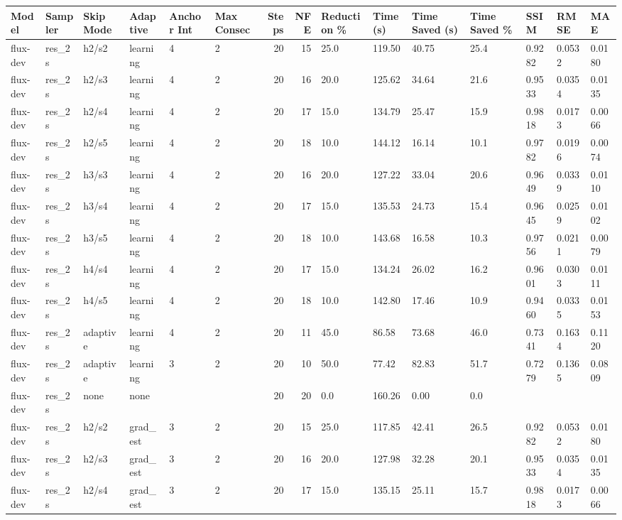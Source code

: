 \begin{tabular}{llllllrrlllllll}
\toprule
Model & Sampler & Skip Mode & Adaptive & Anchor Int & Max Consec & Steps & NFE & Reduction \% & Time (s) & Time Saved (s) & Time Saved \% & SSIM & RMSE & MAE \\
\midrule
flux-dev & res_2s & h2/s2 & learning & 4 & 2 & 20 & 15 & 25.0 & 119.50 & 40.75 & 25.4 & 0.9282 & 0.0532 & 0.0180 \\
flux-dev & res_2s & h2/s3 & learning & 4 & 2 & 20 & 16 & 20.0 & 125.62 & 34.64 & 21.6 & 0.9533 & 0.0354 & 0.0135 \\
flux-dev & res_2s & h2/s4 & learning & 4 & 2 & 20 & 17 & 15.0 & 134.79 & 25.47 & 15.9 & 0.9818 & 0.0173 & 0.0066 \\
flux-dev & res_2s & h2/s5 & learning & 4 & 2 & 20 & 18 & 10.0 & 144.12 & 16.14 & 10.1 & 0.9782 & 0.0196 & 0.0074 \\
flux-dev & res_2s & h3/s3 & learning & 4 & 2 & 20 & 16 & 20.0 & 127.22 & 33.04 & 20.6 & 0.9649 & 0.0339 & 0.0110 \\
flux-dev & res_2s & h3/s4 & learning & 4 & 2 & 20 & 17 & 15.0 & 135.53 & 24.73 & 15.4 & 0.9645 & 0.0259 & 0.0102 \\
flux-dev & res_2s & h3/s5 & learning & 4 & 2 & 20 & 18 & 10.0 & 143.68 & 16.58 & 10.3 & 0.9756 & 0.0211 & 0.0079 \\
flux-dev & res_2s & h4/s4 & learning & 4 & 2 & 20 & 17 & 15.0 & 134.24 & 26.02 & 16.2 & 0.9601 & 0.0303 & 0.0111 \\
flux-dev & res_2s & h4/s5 & learning & 4 & 2 & 20 & 18 & 10.0 & 142.80 & 17.46 & 10.9 & 0.9460 & 0.0335 & 0.0153 \\
flux-dev & res_2s & adaptive & learning & 4 & 2 & 20 & 11 & 45.0 & 86.58 & 73.68 & 46.0 & 0.7341 & 0.1634 & 0.1120 \\
flux-dev & res_2s & adaptive & learning & 3 & 2 & 20 & 10 & 50.0 & 77.42 & 82.83 & 51.7 & 0.7279 & 0.1365 & 0.0809 \\
flux-dev & res_2s & none & none &  &  & 20 & 20 & 0.0 & 160.26 & 0.00 & 0.0 &  &  &  \\
flux-dev & res_2s & h2/s2 & grad_est & 3 & 2 & 20 & 15 & 25.0 & 117.85 & 42.41 & 26.5 & 0.9282 & 0.0532 & 0.0180 \\
flux-dev & res_2s & h2/s3 & grad_est & 3 & 2 & 20 & 16 & 20.0 & 127.98 & 32.28 & 20.1 & 0.9533 & 0.0354 & 0.0135 \\
flux-dev & res_2s & h2/s4 & grad_est & 3 & 2 & 20 & 17 & 15.0 & 135.15 & 25.11 & 15.7 & 0.9818 & 0.0173 & 0.0066 \\

\end{tabular}
